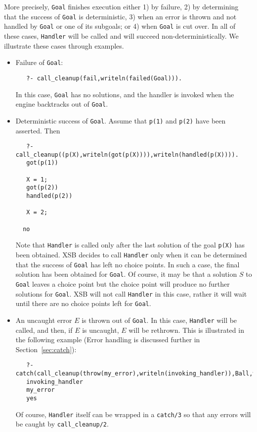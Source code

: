 \begin{description}
More precisely, {\tt Goal} finishes execution either 1) by failure, 2)
by determining that the success of {\tt Goal} is deterministic, 3)
when an error is thrown and not handled by {\tt Goal} or one of its
subgoals; or 4) when {\tt Goal} is cut over.  In all of these cases,
{\tt Handler} will be called and will succeed non-deterministically.
We illustrate these cases through examples.
\begin{itemize}
\item Failure of {\tt Goal}:
\begin{verbatim}
   ?- call_cleanup(fail,writeln(failed(Goal))).
\end{verbatim}
In this case, {\tt Goal} has no solutions, and the handler is invoked
when the engine backtracks out of {\tt Goal}.
%
\item Deterministic success of {\tt Goal}.  Assume that {\tt p(1)} and
  {\tt p(2)} have been asserted.  Then
\begin{verbatim}
   ?- call_cleanup((p(X),writeln(got(p(X)))),writeln(handled(p(X)))).
   got(p(1))

   X = 1;
   got(p(2))
   handled(p(2))

   X = 2;

  no
\end{verbatim}
Note that {\tt Handler} is called only after the last solution of the
goal {\tt p(X)} has been obtained.  XSB decides to call {\tt Handler}
only when it can be determined that the success of {\tt Goal} has left
no choice points.  In such a case, the final solution has been
obtained for {\tt Goal}.  Of course, it may be that a solution $S$ to
{\tt Goal} leaves a choice point but the choice point will produce no
further solutions for {\tt Goal}.  XSB will not call {\tt Handler} in
this case, rather it will wait until there are no choice points left
for {\tt Goal}.

\item An uncaught error $E$ is thrown out of {\tt Goal}.  In this
  case, {\tt Handler} will be called, and then, if $E$ is uncaught,
  $E$ will be rethrown.  This is illustrated in the following example
  (Error handling is discussed further in Section~\ref{sec:catch}):
\begin{verbatim}
   ?- catch(call_cleanup(throw(my_error),writeln(invoking_handler)),Ball,write(Ball)).
   invoking_handler
   my_error
   yes
\end{verbatim}
Of course, {\tt Handler} itself can be wrapped in a {\tt catch/3} so
that any errors will be caught by {\tt call\_cleanup/2}.


\end{itemize}
\end{description}
